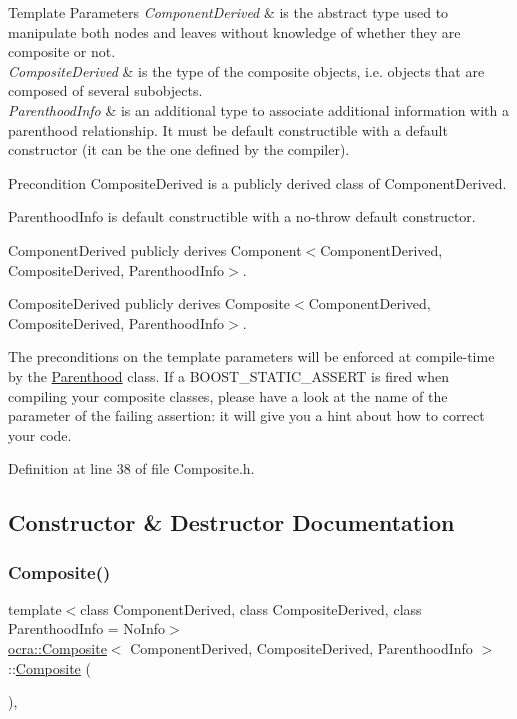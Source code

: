 \begin{DoxyTemplParams}{Template Parameters}
{\em Component\+Derived} & is the abstract type used to manipulate both nodes and leaves without knowledge of whether they are composite or not. \\
\hline
{\em Composite\+Derived} & is the type of the composite objects, i.\+e. objects that are composed of several subobjects. \\
\hline
{\em Parenthood\+Info} & is an additional type to associate additional information with a parenthood relationship. It must be default constructible with a default constructor (it can be the one defined by the compiler).\\
\hline
\end{DoxyTemplParams}
\begin{DoxyPrecond}{Precondition}
Composite\+Derived is a publicly derived class of Component\+Derived. 

Parenthood\+Info is default constructible with a no-\/throw default constructor. 

Component\+Derived publicly derives Component$<$\+Component\+Derived, Composite\+Derived, Parenthood\+Info$>$. 

Composite\+Derived publicly derives Composite$<$\+Component\+Derived, Composite\+Derived, Parenthood\+Info$>$.
\end{DoxyPrecond}
The preconditions on the template parameters will be enforced at compile-\/time by the \hyperlink{classocra_1_1Parenthood}{Parenthood} class. If a B\+O\+O\+S\+T\+\_\+\+S\+T\+A\+T\+I\+C\+\_\+\+A\+S\+S\+E\+RT is fired when compiling your composite classes, please have a look at the name of the parameter of the failing assertion\+: it will give you a hint about how to correct your code. 

Definition at line 38 of file Composite.\+h.



\subsection{Constructor \& Destructor Documentation}
\hypertarget{classocra_1_1Composite_a20b2ebe11c98b53d3d04dc7d1a7a1b60}{}\label{classocra_1_1Composite_a20b2ebe11c98b53d3d04dc7d1a7a1b60} 
\subsubsection{\texorpdfstring{Composite()}{Composite()}}
{\footnotesize\ttfamily template$<$class Component\+Derived, class Composite\+Derived, class Parenthood\+Info = No\+Info$>$ \\
\hyperlink{classocra_1_1Composite}{ocra\+::\+Composite}$<$ Component\+Derived, Composite\+Derived, Parenthood\+Info $>$\+::\hyperlink{classocra_1_1Composite}{Composite} (\begin{DoxyParamCaption}{ }\end{DoxyParamCaption})\hspace{0.3cm}{\ttfamily [inline]}, {\ttfamily [protected]}}



